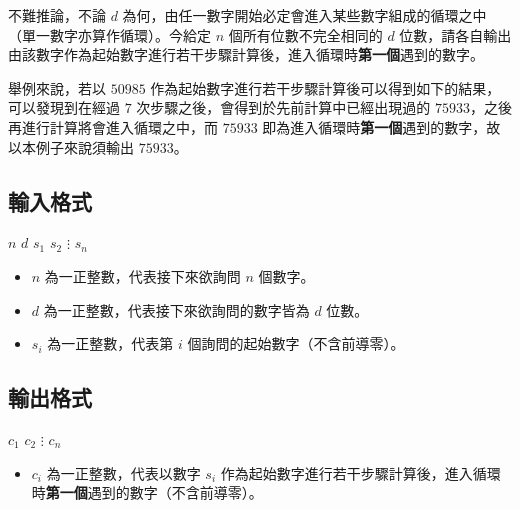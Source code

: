 不難推論，不論 \(d\)
為何，由任一數字開始必定會進入某些數字組成的循環之中（單一數字亦算作循環）。今給定
\(n\) 個所有位數不完全相同的 \(d\)
位數，請各自輸出由該數字作為起始數字進行若干步驟計算後，進入循環時\textbf{第一個}遇到的數字。

舉例來說，若以 \(50985\)
作為起始數字進行若干步驟計算後可以得到如下的結果，可以發現到在經過 \(7\)
次步驟之後，會得到於先前計算中已經出現過的
\(75933\)，之後再進行計算將會進入循環之中，而 \(75933\)
即為進入循環時\textbf{第一個}遇到的數字，故以本例子來說須輸出
\(75933\)。 \newline  \vspace{-1em}


\subsection{輸入格式}

\begin{format}
\f{
$n$ $d$
$s_1$
$s_2$
$\vdots$
$s_n$
}
\end{format}

\begin{itemize}
\tightlist
\item
  \(n\) 為一正整數，代表接下來欲詢問 \(n\) 個數字。
\item
  \(d\) 為一正整數，代表接下來欲詢問的數字皆為 \(d\) 位數。
\item
  \(s_i\) 為一正整數，代表第 \(i\) 個詢問的起始數字（不含前導零）。
\end{itemize}

\subsection{輸出格式}

\begin{format}
\f{
$c_1$
$c_2$
$\vdots$
$c_n$
}
\end{format}

\begin{itemize}
\tightlist
\item
  \(c_i\) 為一正整數，代表以數字 \(s_i\)
  作為起始數字進行若干步驟計算後，進入循環時\textbf{第一個}遇到的數字（不含前導零）。
\end{itemize}

